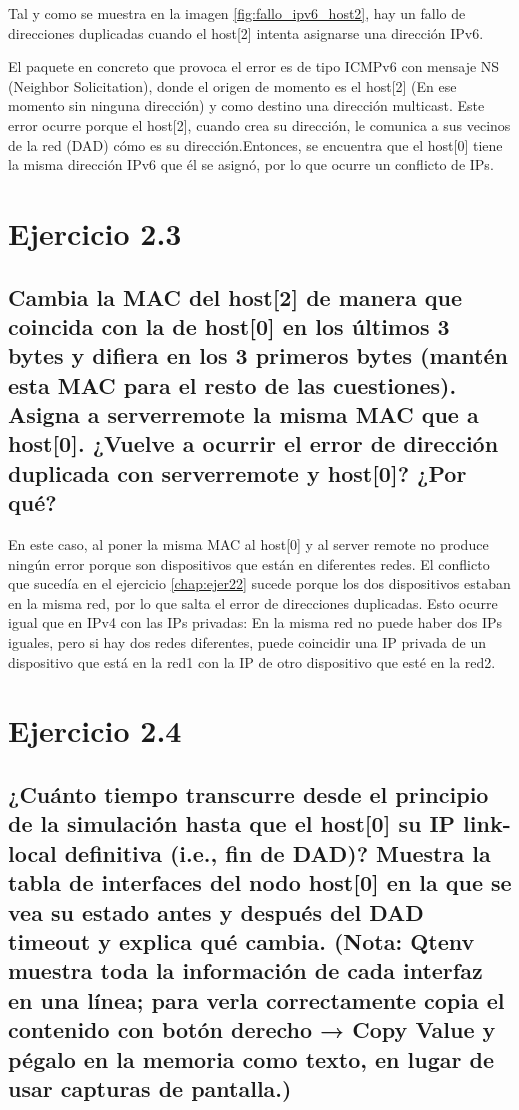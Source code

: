 Tal y como se muestra en la imagen \ref{fig:fallo_ipv6_host2}, hay un fallo de direcciones duplicadas cuando el host[2] intenta asignarse una dirección IPv6. 

El paquete en concreto que provoca el error es de tipo ICMPv6 con mensaje NS (Neighbor Solicitation), donde el origen de momento es el host[2] (En ese momento sin ninguna dirección) y como destino una dirección multicast. Este error ocurre porque el host[2], cuando crea su dirección, le comunica a sus vecinos de la red (DAD) cómo es su dirección.Entonces, se encuentra que el host[0] tiene la misma dirección IPv6 que él se asignó, por lo que ocurre un conflicto de IPs.

\section{Ejercicio 2.3}
\subsection{Cambia la MAC del host[2] de manera que coincida con la de host[0] en los últimos 3 bytes y difiera en los 3
primeros bytes (mantén esta MAC para el resto de las cuestiones). Asigna a serverremote la misma MAC que a
host[0]. ¿Vuelve a ocurrir el error de dirección duplicada con serverremote y host[0]? ¿Por qué?}

En este caso, al poner la misma MAC al host[0] y al server remote no produce ningún error porque son dispositivos que están en diferentes redes. 
El conflicto que sucedía en el ejercicio \ref{chap:ejer22} sucede porque los dos dispositivos estaban en la misma red, por lo que salta el error de 
direcciones duplicadas. Esto ocurre igual que en IPv4 con las IPs privadas: En la misma red no puede haber dos IPs iguales, pero si hay dos redes diferentes, puede coincidir una IP privada de un dispositivo que está en la red1 con la IP de otro dispositivo que esté en la red2.

\section{Ejercicio 2.4}
\subsection{¿Cuánto tiempo transcurre desde el principio de la simulación hasta que el host[0] su IP link-local definitiva
(i.e., fin de DAD)? Muestra la tabla de interfaces del nodo host[0] en la que se vea su estado antes y después del
DAD timeout y explica qué cambia. (Nota: Qtenv muestra toda la información de cada interfaz en una línea;
para verla correctamente copia el contenido con botón derecho → Copy Value y pégalo en la memoria como
texto, en lugar de usar capturas de pantalla.)}


